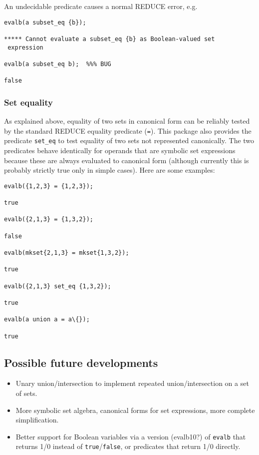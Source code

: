 An undecidable predicate causes a normal REDUCE error, e.g.
\begin{verbatim}
evalb(a subset_eq {b});

***** Cannot evaluate a subset_eq {b} as Boolean-valued set
 expression

evalb(a subset_eq b);  %%% BUG

false
\end{verbatim}


\subsubsection{Set equality}

As explained above, equality of two sets in canonical form can be
reliably tested by the standard REDUCE equality predicate (\texttt{=}).
This package also provides the predicate \texttt{set\_eq} to test
equality of two sets not represented canonically.  The two predicates
behave identically for operands that are symbolic set expressions
because these are always evaluated to canonical form (although
currently this is probably strictly true only in simple cases).  Here
are some examples:
\begin{verbatim}
evalb({1,2,3} = {1,2,3});

true

evalb({2,1,3} = {1,3,2});

false

evalb(mkset{2,1,3} = mkset{1,3,2});

true

evalb({2,1,3} set_eq {1,3,2});

true

evalb(a union a = a\{});

true
\end{verbatim}


\subsection{Possible future developments}

\begin{itemize}
\item Unary union/intersection to implement repeated
  union/intersection on a set of sets.
\item More symbolic set algebra, canonical forms for set expressions,
  more complete simplification.
\item Better support for Boolean variables via a version (evalb10?)
  of \texttt{evalb} that returns 1/0 instead of \texttt{true}/\texttt{false},
  or predicates that return 1/0 directly.
\end{itemize}
